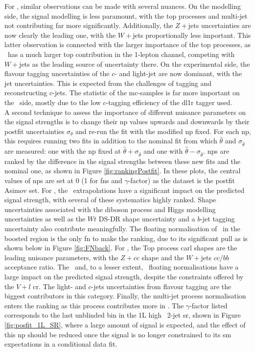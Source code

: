 For \vhc, similar observations can be made with several nuances. On the modelling side, the signal modelling is less paramount, with the top processes and multi-jet not contributing far more significantly. Additionally, the $Z+$jets uncertainties are now clearly the leading one, with the $W+$jets proportionally less important. This latter observation is connected with the larger importance of the top processes, as \vhc\ has a much larger top contribution in the 1-lepton channel, competing with $W+$jets as the leading source of uncertainty there. On the experimental side, the flavour tagging uncertainties of the $c$- and light-jet are now dominant, with the jet uncertainties. This is expected from the challenges of tagging and reconstructing $c$-jets. The statistic of the \gls{mc}-samples is far more important on the \vhc\ side, mostly due to the low $c$-tagging efficiency of the \gls{dl1r} tagger used. \\

A second technique to assess the importance of different nuisance parameters on the signal strengths is to change their \gls{np} values upwards and downwards by their postfit uncertainties $\sigma_{\theta}$ and re-run the fit with the modified \gls{np} fixed. For each \gls{np}, this requires running two fits in addition to the nominal fit from which $\hat{\theta}$ and $\sigma_{\hat{\theta}}$ are measured: one with the \gls{np} fixed at $\hat{\theta} + \sigma_{\hat{\theta}}$ and one with $\hat{\theta} - \sigma_{\hat{\theta}}$. \gls{np}s are ranked by the difference in the signal strengths between these new fits and the nominal one, as shown in Figure \ref{fig:rankingPostfit}. In these plots, the central values of \gls{np}s are set at 0 (1 for \gls{fn}s and $\gamma$-factor) as the dataset is the postfit Asimov set. For \vhb, the \whf\ extrapolations have a significant impact on the predicted signal strength, with several of these systematics highly ranked. Shape uncertainties associated with the diboson process and Higgs modelling uncertainties as well as the $Wt$ DS-DR shape uncertainty and a $b$-jet tagging uncertainty also contribute meaningfully. The floating normalisation of \whf\ in the boosted region is the only \gls{fn} to make the ranking, due to its significant pull as is shown below in Figure \ref{fig:FNback}. For \vhc, the Top process \gls{carl} shapes are the leading nuisance parameters, with the $Z+cc$ shape and the $W+$jets $cc/bb$ acceptance ratio. The \zlf\ and, to a lesser extent, \wlf\ floating normalisations have a large impact on the predicted signal strength, despite the constraints offered by the $V+l$ \gls{cr}. The light- and $c$-jets uncertainties from flavour tagging are the biggest contributors in this category. Finally, the multi-jet process normalisation enters the ranking as this process contributes more in \vhc. The $\gamma$-factor listed corresponds to the last unblinded bin in the 1L high \ptv\ 2-jet \gls{sr}, shown in Figure \ref{fig:posfit_1L_SR}, where a large amount of signal is expected, and the effect of this \gls{np} should be reduced once the signal is no longer constrained to its \gls{sm} expectations in a conditional data fit.

